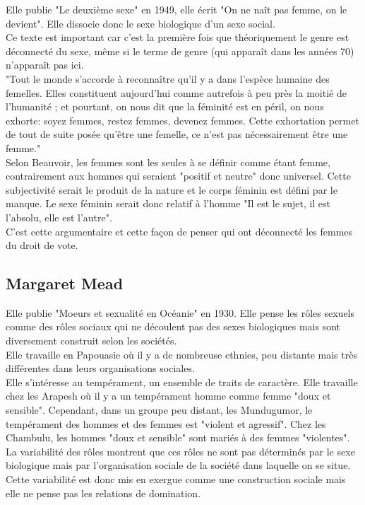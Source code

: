 \documentclass[12pt, a4paper, openany]{book}
\begin{document}
Elle publie "Le deuxième sexe" en 1949, elle écrit "On ne naît pas femme, on le devient". Elle dissocie donc le sexe biologique d'un sexe social. \\
Ce texte est important car c'est la première fois que théoriquement le genre est déconnecté du sexe, même si le terme de genre (qui apparaît dans les années 70) n'apparaît pas ici. \\
"Tout le monde s'accorde à reconnaître qu'il y a dans l'espèce humaine des femelles. Elles constituent aujourd'hui comme autrefois à peu près la moitié de l'humanité ; et pourtant, on nous dit que la féminité est en péril, on nous exhorte: soyez femmes, restez femmes, devenez femmes. Cette exhortation permet de tout de suite posée qu'être une femelle, ce n'est pas nécessairement être une femme." \\
Selon Beauvoir, les femmes sont les seules à se définir comme étant femme, contrairement aux hommes qui seraient "positif et neutre" donc universel. Cette subjectivité serait le produit de la nature et le corps féminin est défini par le manque. Le sexe féminin serait donc relatif à l'homme "Il est le sujet, il est l'absolu, elle est l'autre". \\
C'est cette argumentaire et cette façon de penser qui ont déconnecté les femmes du droit de vote.

\subsection{Margaret Mead}

Elle publie "Moeurs et sexualité en Océanie" en 1930. Elle pense les rôles sexuels comme des rôles sociaux qui ne découlent pas des sexes biologiques mais sont diversement construit selon les sociétés. \\
Elle travaille en Papouasie où il y a de nombreuse ethnies, peu distante mais très différentes dans leurs organisations sociales. \\
Elle s'intéresse au tempérament, un ensemble de traits de caractère. Elle travaille chez les Arapesh où il y a un tempérament homme comme femme "doux et sensible". Cependant, dans un groupe peu distant, les Mundugumor, le tempérament des hommes et des femmes est "violent et agressif". Chez les Chambulu, les hommes "doux et sensible" sont mariés à des femmes "violentes". \\
La variabilité des rôles montrent que ces rôles ne sont pas déterminés par le sexe biologique mais par l'organisation sociale de la société dans laquelle on se situe. \\
Cette variabilité est donc mis en exergue comme une construction sociale mais elle ne pense pas les relations de domination. 
\end{document}
